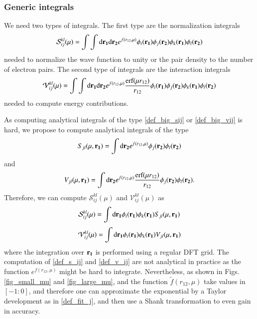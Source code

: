 \documentclass[aip,jcp,reprint,noshowkeys,superscriptaddress]{revtex4-1}
\newcommand{\bd}[1]{{\bf {#1}}}
\newcommand{\dr}[1]{\text{d}{\bf {#1}}}
\begin{document}
\subsubsection{Generic integrals}
We need two types of integrals. 
The first type are the normalization integrals 
\begin{equation}
 \label{def_big_sij}
 \mathcal{S}_{ij}^{kl}(\mu) = \int \int \dr{r_1}\dr{r_2} e^{f(r_{12},\mu)} \phi_i(\bd{r_1}) \phi_j(\bd{r_2}) \phi_k(\bd{r_1}) \phi_l(\bd{r_2})
\end{equation}
needed to normalize the wave function to unity or the pair density to the number of electron pairs. 
The second type of integrals are the interaction integrals 
\begin{equation}
 \label{def_big_vij}
 \mathcal{V}_{ij}^{kl}(\mu) = \int \int \dr{r_1}\dr{r_2} e^{f(r_{12},\mu)} \frac{\text{erf}(\mu r_{12})}{r_{12}}\phi_i(\bd{r_1}) \phi_j(\bd{r_2}) \phi_k(\bd{r_1}) \phi_l(\bd{r_2})
\end{equation}
needed to compute energy contributions.  

As computing analytical integrals of the type \eqref{def_big_sij} or \eqref{def_big_vij} is hard, we propose to compute analytical integrals of the type
\begin{equation}
 \label{def_s_ij}
 S_{jl}(\mu,\bd{r_1}) = \int \dr{r_2} e^{f(r_{12},\mu)} \phi_j(\bd{r_2}) \phi_l(\bd{r_2})
\end{equation}
and 
\begin{equation}
 \label{def_v_ij}
 V_{jl}(\mu,\bd{r_1}) = \int \dr{r_2} e^{f(r_{12},\mu)}\frac{\text{erf}(\mu r_{12})}{r_{12}}\phi_j(\bd{r_2}) \phi_l(\bd{r_2}).
\end{equation}
Therefore, we can compute $\mathcal{S}_{ij}^{kl}(\mu)$ and $\mathcal{V}_{ij}^{kl}(\mu)$ as
\begin{equation}
 \label{def_big_sij_bis}
 \mathcal{S}_{ij}^{kl}(\mu) = \int \dr{r_1} \phi_i(\bd{r_1})  \phi_k(\bd{r_1})S_{jl}(\mu,\bd{r_1})
\end{equation}
\begin{equation}
 \label{def_big_sij_bis}
 \mathcal{V}_{ij}^{kl}(\mu) = \int \dr{r_1} \phi_i(\bd{r_1})  \phi_k(\bd{r_1})V_{jl}(\mu,\bd{r_1})
\end{equation}
where the integration over $\bd{r_1}$ is performed using a regular DFT grid. 
The computation of \eqref{def_s_ij} and \eqref{def_v_ij} are not analytical in practice as the function $e^{f(r_{12},\mu)}$ might be hard to integrate. 
Nevertheless, as shown in Figs. \ref{fig_small_mu} and \ref{fig_large_mu},  and the function $\tilde{f}(r_{12},\mu)$ take values in $[-1:0]$, and therefore one can approximate the exponential by a Taylor development as in \eqref{def_fit_j}, and then use a Shank transformation to even gain in accuracy. 
\end{document}
